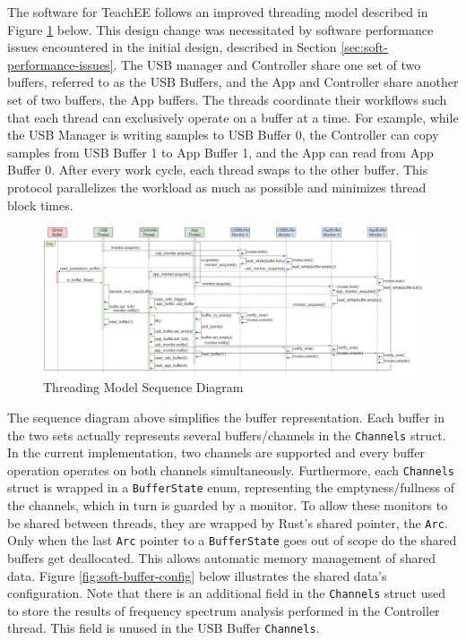 \documentclass[letterpaper,11pt]{article}
\newcommand{\code}[1]{\texttt{#1}}
\begin{document}
The software for TeachEE follows an improved threading model described in
Figure \ref{fig:soft-sequence-diagram} below. This design change was necessitated
by software performance issues encountered in the initial design, described in
Section \ref{sec:soft-performance-issues}. The USB manager and Controller share one set of
two buffers, referred to as the USB Buffers, and the App and Controller share
another set of two buffers, the App buffers. The threads coordinate their workflows
such that each thread can exclusively operate on a buffer at a time. For example,
while the USB Manager is writing samples to USB Buffer 0, the Controller can copy
samples from USB Buffer 1 to App Buffer 1, and the App can read from App Buffer 0.
After every work cycle, each thread swaps to the other buffer. This protocol
parallelizes the workload as much as possible and minimizes thread block times.

\begin{figure}[H]
  \centering
  \includegraphics[width=\textwidth]{../../misc/sequence_diagram.drawio.png}
  \caption{Threading Model Sequence Diagram}
  \label{fig:soft-sequence-diagram}
\end{figure}

The sequence diagram above simplifies the buffer representation. Each buffer in the
two sets actually represents several buffers/channels in the \code{Channels}
struct. In the current implementation, two channels are supported and every buffer
operation operates on both channels simultaneously. Furthermore, each \code{Channels}
struct is wrapped in a \code{BufferState} enum, representing the emptyness/fullness
of the channels, which in turn is guarded by a monitor. To allow these monitors to
be shared between threads, they are wrapped by Rust's shared pointer, the \code{Arc}.
Only when the last \code{Arc} pointer to a \code{BufferState} goes out of scope do the
shared buffers get deallocated. This allows automatic memory management of shared data.
Figure \ref{fig:soft-buffer-config} below illustrates the shared data's configuration.
Note that there is an additional field in the \code{Channels} struct used to store the
results of frequency spectrum analysis performed in the Controller thread. This field
is unused in the USB Buffer \code{Channels}.
\end{document}
